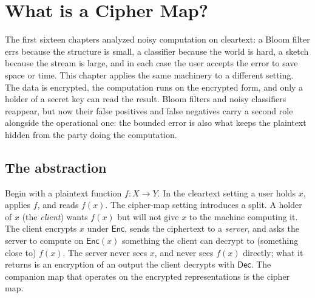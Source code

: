%

\section{What is a Cipher Map?}
\label{sec:what-is-cipher-map}

The first sixteen chapters analyzed noisy computation on cleartext: a
Bloom filter errs because the structure is small, a classifier because
the world is hard, a sketch because the stream is large, and in each
case the user accepts the error to save space or time. This chapter
applies the same machinery to a different setting. The data is
encrypted, the computation runs on the encrypted form, and only a holder
of a secret key can read the result. Bloom filters and noisy classifiers
reappear, but now their false positives and false negatives carry a
second role alongside the operational one: the bounded error is also
what keeps the plaintext hidden from the party doing the computation.

\subsection*{The abstraction}

Begin with a plaintext function $f : X \to Y$. In the cleartext setting
a user holds $x$, applies $f$, and reads $f(x)$. The cipher-map setting
introduces a split. A holder of $x$ (the \emph{client}) wants $f(x)$ but
will not give $x$ to the machine computing it. The client encrypts $x$
under $\mathsf{Enc}$, sends the ciphertext to a \emph{server}, and asks
the server to compute on $\mathsf{Enc}(x)$ something the client can
decrypt to (something close to) $f(x)$. The server never sees $x$, and
never sees $f(x)$ directly; what it returns is an encryption of an
output the client decrypts with $\mathsf{Dec}$. The companion map that
operates on the encrypted representations is the cipher map.


